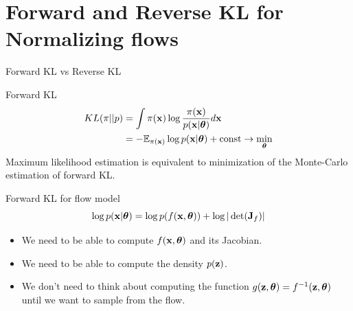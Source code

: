\section{Forward and Reverse KL for Normalizing flows}
\begin{frame}{Forward KL vs Reverse KL}
	\begin{block}{Forward KL}
		\vspace{-0.5cm}
		\begin{align*}
			KL(\pi || p) &= \int \pi (\mathbf{x}) \log \frac{\pi(\mathbf{x})}{p(\mathbf{x} | \boldsymbol{\theta})} d \mathbf{x} \\
			&= - \mathbb{E}_{\pi(\mathbf{x})} \log p(\mathbf{x} | \boldsymbol{\theta}) + \text{const} \rightarrow \min_{\boldsymbol{\theta}}
		\end{align*}
		Maximum likelihood estimation is equivalent to minimization of the Monte-Carlo estimation of forward KL.
	\end{block}
	\begin{block}{Forward KL for flow model}
	    \vspace{-0.1cm}
		\[
			\log p(\mathbf{x}|\boldsymbol{\theta}) = \log p(f(\mathbf{x}, \boldsymbol{\theta})) + \log  |\det (\mathbf{J}_f)|
		\]
		\vspace{-0.2cm}
		\begin{itemize}
			\item We need to be able to compute $f(\mathbf{x}, \boldsymbol{\theta})$ and its Jacobian.
			\item We need to be able to compute the density $p(\mathbf{z})$.
			\item We don’t need to think about computing the function $g(\mathbf{z}, \boldsymbol{\theta}) = f^{-1}(\mathbf{z}, \boldsymbol{\theta})$ until we want to sample from the flow.
		\end{itemize}
	\end{block}
\end{frame}
